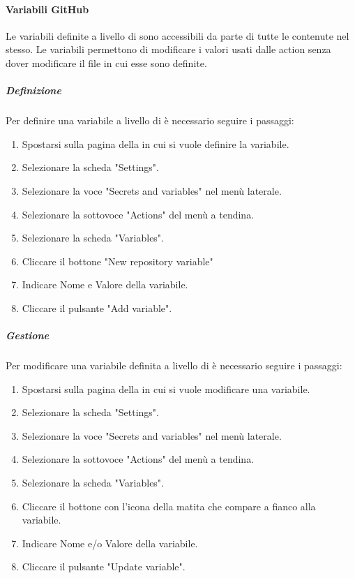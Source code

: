 \paragraph{Variabili GitHub}
Le variabili definite a livello di  sono accessibili da parte di tutte le  contenute nel  stesso.
Le variabili permettono di modificare i valori usati dalle action senza dover modificare il file in cui esse sono definite.

\subparagraph{Definizione}
Per definire una variabile a livello di  è necessario seguire i passaggi:
\begin{enumerate}
    \item Spostarsi sulla pagina della  in cui si vuole definire la variabile.
    \item Selezionare la scheda "Settings".
    \item Selezionare la voce "Secrets and variables" nel menù laterale.
    \item Selezionare la sottovoce "Actions" del menù a tendina.
    \item Selezionare la scheda "Variables".
    \item Cliccare il bottone "New repository variable" 
    \item Indicare Nome e Valore della variabile.
    \item Cliccare il pulsante "Add variable".
\end{enumerate}

\subparagraph{Gestione}
Per modificare una variabile definita a livello di  è necessario seguire i passaggi:
\begin{enumerate}
    \item Spostarsi sulla pagina della  in cui si vuole modificare una variabile.
    \item Selezionare la scheda "Settings".
    \item Selezionare la voce "Secrets and variables" nel menù laterale.
    \item Selezionare la sottovoce "Actions" del menù a tendina.
    \item Selezionare la scheda "Variables".
    \item Cliccare il bottone con l'icona della matita che compare a fianco alla variabile.
    \item Indicare Nome e/o Valore della variabile.
    \item Cliccare il pulsante "Update variable".
\end{enumerate}

